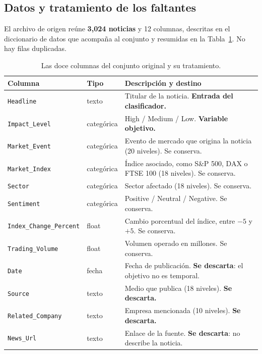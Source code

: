 \documentclass[11pt, a4paper]{article}
\begin{document}
\subsection{Datos y tratamiento de los faltantes}

El archivo de origen reúne \textbf{3{,}024 noticias} y 12 columnas, descritas en el diccionario de
datos que acompaña al conjunto y resumidas en la Tabla~\ref{tab:columnas}. No hay filas duplicadas.

\begin{table}[H]
\centering
\caption{Las doce columnas del conjunto original y su tratamiento.}
\label{tab:columnas}
\small
\renewcommand{\arraystretch}{1.12}
\begin{tabular}{l l p{7.3cm}}
\toprule
\textbf{Columna} & \textbf{Tipo} & \textbf{Descripción y destino} \\
\midrule
\texttt{Headline}             & texto       & Titular de la noticia. \textbf{Entrada del clasificador.} \\
\texttt{Impact\_Level}        & categórica  & High / Medium / Low. \textbf{Variable objetivo.} \\
\texttt{Market\_Event}        & categórica  & Evento de mercado que origina la noticia (20 niveles). Se conserva. \\
\texttt{Market\_Index}        & categórica  & Índice asociado, como S\&P 500, DAX o FTSE 100 (18 niveles). Se conserva. \\
\texttt{Sector}               & categórica  & Sector afectado (18 niveles). Se conserva. \\
\texttt{Sentiment}            & categórica  & Positive / Neutral / Negative. Se conserva. \\
\texttt{Index\_Change\_Percent}& float      & Cambio porcentual del índice, entre $-5$ y $+5$. Se conserva. \\
\texttt{Trading\_Volume}      & float       & Volumen operado en millones. Se conserva. \\
\texttt{Date}                 & fecha       & Fecha de publicación. \textbf{Se descarta}: el objetivo no es temporal. \\
\texttt{Source}               & texto       & Medio que publica (18 niveles). \textbf{Se descarta.} \\
\texttt{Related\_Company}     & texto       & Empresa mencionada (10 niveles). \textbf{Se descarta.} \\
\texttt{News\_Url}            & texto       & Enlace de la fuente. \textbf{Se descarta}: no describe la noticia. \\
\bottomrule
\end{tabular}
\end{table}
\end{document}
